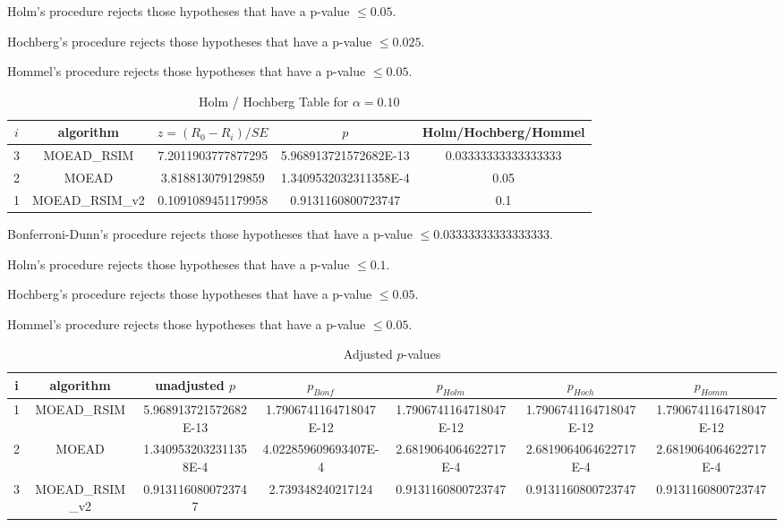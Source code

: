 \documentclass[a4paper,10pt]{article}
\begin{document}
\begin{landscape}
Holm's procedure rejects those hypotheses that have a p-value $\le0.05$.


Hochberg's procedure rejects those hypotheses that have a p-value $\le0.025$.


Hommel's procedure rejects those hypotheses that have a p-value $\le0.05$.


\begin{table}[!htp]
\centering\tiny
\caption{Holm / Hochberg Table for $\alpha=0.10$}
\begin{tabular}{ccccc}
$i$&algorithm&$z=(R_0 - R_i)/SE$&$p$&Holm/Hochberg/Hommel\\
\hline
3&MOEAD_RSIM&7.2011903777877295&5.968913721572682E-13&0.03333333333333333\\
2&MOEAD&3.818813079129859&1.3409532032311358E-4&0.05\\
1&MOEAD_RSIM_v2&0.1091089451179958&0.9131160800723747&0.1\\
\hline
\end{tabular}
\end{table}
Bonferroni-Dunn's procedure rejects those hypotheses that have a p-value $\le0.03333333333333333$.


Holm's procedure rejects those hypotheses that have a p-value $\le0.1$.


Hochberg's procedure rejects those hypotheses that have a p-value $\le0.05$.


Hommel's procedure rejects those hypotheses that have a p-value $\le0.05$.


\begin{table}[!htp]
\centering\tiny
\caption{Adjusted $p$-values}
\begin{tabular}{ccccccc}
i&algorithm&unadjusted $p$&$p_{Bonf}$&$p_{Holm}$&$p_{Hoch}$&$p_{Homm}$\\
\hline
1&MOEAD_RSIM&5.968913721572682E-13&1.7906741164718047E-12&1.7906741164718047E-12&1.7906741164718047E-12&1.7906741164718047E-12\\
2&MOEAD&1.3409532032311358E-4&4.022859609693407E-4&2.6819064064622717E-4&2.6819064064622717E-4&2.6819064064622717E-4\\
3&MOEAD_RSIM_v2&0.9131160800723747&2.739348240217124&0.9131160800723747&0.9131160800723747&0.9131160800723747\\
\hline
\end{tabular}
\end{table}


\end{landscape}
\end{document}

